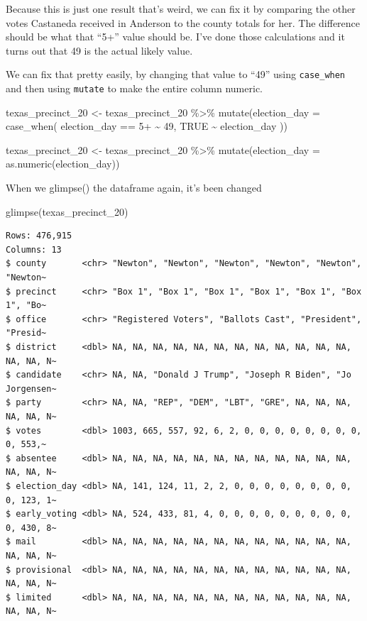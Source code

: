 \documentclass[
  letterpaper,
  DIV=11,
  numbers=noendperiod]{scrreprt}
\newenvironment{Shaded}{\begin{snugshade}}{\end{snugshade}}
\newcommand{\AttributeTok}[1]{\textcolor[rgb]{0.40,0.45,0.13}{#1}}
\newcommand{\ConstantTok}[1]{\textcolor[rgb]{0.56,0.35,0.01}{#1}}
\newcommand{\FunctionTok}[1]{\textcolor[rgb]{0.28,0.35,0.67}{#1}}
\newcommand{\NormalTok}[1]{\textcolor[rgb]{0.00,0.23,0.31}{#1}}
\newcommand{\OtherTok}[1]{\textcolor[rgb]{0.00,0.23,0.31}{#1}}
\newcommand{\SpecialCharTok}[1]{\textcolor[rgb]{0.37,0.37,0.37}{#1}}
\newcommand{\StringTok}[1]{\textcolor[rgb]{0.13,0.47,0.30}{#1}}
\begin{document}
Because this is just one result that's weird, we can fix it by comparing
the other votes Castaneda received in Anderson to the county totals for
her. The difference should be what that ``5+'' value should be. I've
done those calculations and it turns out that 49 is the actual likely
value.

We can fix that pretty easily, by changing that value to ``49'' using
\texttt{case\_when} and then using \texttt{mutate} to make the entire
column numeric.

\begin{Shaded}
\begin{Highlighting}[]
\NormalTok{texas\_precinct\_20 }\OtherTok{\textless{}{-}}\NormalTok{ texas\_precinct\_20 }\SpecialCharTok{\%\textgreater{}\%}
  \FunctionTok{mutate}\NormalTok{(}\AttributeTok{election\_day =} \FunctionTok{case\_when}\NormalTok{(}
\NormalTok{    election\_day }\SpecialCharTok{==} \StringTok{\textquotesingle{}5+\textquotesingle{}} \SpecialCharTok{\textasciitilde{}} \StringTok{\textquotesingle{}49\textquotesingle{}}\NormalTok{,}
    \ConstantTok{TRUE} \SpecialCharTok{\textasciitilde{}}\NormalTok{ election\_day}
\NormalTok{  ))}

\NormalTok{texas\_precinct\_20 }\OtherTok{\textless{}{-}}\NormalTok{ texas\_precinct\_20 }\SpecialCharTok{\%\textgreater{}\%} \FunctionTok{mutate}\NormalTok{(}\AttributeTok{election\_day =} \FunctionTok{as.numeric}\NormalTok{(election\_day))}
\end{Highlighting}
\end{Shaded}

When we glimpse() the dataframe again, it's been changed

\begin{Shaded}
\begin{Highlighting}[]
\FunctionTok{glimpse}\NormalTok{(texas\_precinct\_20)}
\end{Highlighting}
\end{Shaded}

\begin{verbatim}
Rows: 476,915
Columns: 13
$ county       <chr> "Newton", "Newton", "Newton", "Newton", "Newton", "Newton~
$ precinct     <chr> "Box 1", "Box 1", "Box 1", "Box 1", "Box 1", "Box 1", "Bo~
$ office       <chr> "Registered Voters", "Ballots Cast", "President", "Presid~
$ district     <dbl> NA, NA, NA, NA, NA, NA, NA, NA, NA, NA, NA, NA, NA, NA, N~
$ candidate    <chr> NA, NA, "Donald J Trump", "Joseph R Biden", "Jo Jorgensen~
$ party        <chr> NA, NA, "REP", "DEM", "LBT", "GRE", NA, NA, NA, NA, NA, N~
$ votes        <dbl> 1003, 665, 557, 92, 6, 2, 0, 0, 0, 0, 0, 0, 0, 0, 0, 553,~
$ absentee     <dbl> NA, NA, NA, NA, NA, NA, NA, NA, NA, NA, NA, NA, NA, NA, N~
$ election_day <dbl> NA, 141, 124, 11, 2, 2, 0, 0, 0, 0, 0, 0, 0, 0, 0, 123, 1~
$ early_voting <dbl> NA, 524, 433, 81, 4, 0, 0, 0, 0, 0, 0, 0, 0, 0, 0, 430, 8~
$ mail         <dbl> NA, NA, NA, NA, NA, NA, NA, NA, NA, NA, NA, NA, NA, NA, N~
$ provisional  <dbl> NA, NA, NA, NA, NA, NA, NA, NA, NA, NA, NA, NA, NA, NA, N~
$ limited      <dbl> NA, NA, NA, NA, NA, NA, NA, NA, NA, NA, NA, NA, NA, NA, N~
\end{verbatim}
\end{document}
